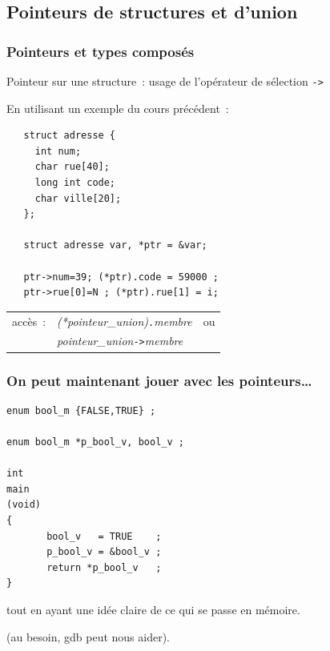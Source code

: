 \begin{frame}[fragile]
 \section{Pointeurs de structures et d'union}
 \frametitle{Pointeurs et types compos\'es}
 Pointeur sur une structure~: usage de l'op\'erateur de s\'election \verb?->? 
 \par\smallskip
 En utilisant un exemple du cours pr\'ec\'edent~:
\begin{verbatim}
   struct adresse {  
     int num;        
     char rue[40];   
     long int code;  
     char ville[20]; 
   };                

   struct adresse var, *ptr = &var; 
  
   ptr->num=39; (*ptr).code = 59000 ;
   ptr->rue[0]=N ; (*ptr).rue[1] = i;
\end{verbatim}
\par
\begin{tabular}{lll}
  acc\`es~: & {\it (*pointeur\_union)}{\tt .}{\it membre} & ou \\
&  {\it pointeur\_union}\verb?->?{\it membre} 
 \end{tabular}
\end{frame}
\begin{frame}[fragile]
\frametitle{On peut maintenant jouer avec les pointeurs\ldots}
\begin{verbatim}
enum bool_m {FALSE,TRUE} ;

enum bool_m *p_bool_v, bool_v ;

int 
main
(void) 
{
       bool_v   = TRUE    ;
       p_bool_v = &bool_v ;
       return *p_bool_v   ;
}
\end{verbatim}
\hfill tout en ayant une id\'ee claire de ce qui se passe en m\'emoire.  
\par
\hfill (au besoin, gdb peut nous aider).
\end{frame}



